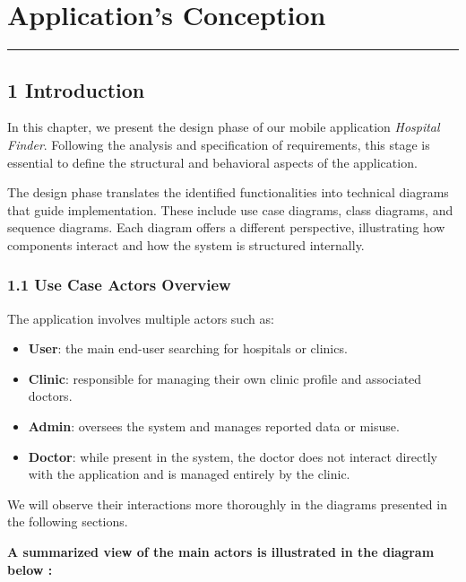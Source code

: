 \documentclass[12pt]{report}
\begin{document}
\newpage

\chapter{\textbf{Application's Conception}}
\rule{\linewidth}{1.5pt}


\section*{\textbf{1 Introduction}}

\noindent In this chapter, we present the design phase of our mobile application \textit{Hospital Finder}. Following the analysis and specification of requirements, this stage is essential to define the structural and behavioral aspects of the application.

\noindent The design phase translates the identified functionalities into technical diagrams that guide implementation. These include use case diagrams, class diagrams, and sequence diagrams. Each diagram offers a different perspective, illustrating how components interact and how the system is structured internally.

\subsection*{1.1 Use Case Actors Overview}

\noindent The application involves multiple actors such as:

\begin{itemize}
	\item \textbf{User}: the main end-user searching for hospitals or clinics.
	\item \textbf{Clinic}: responsible for managing their own clinic profile and associated doctors.
	\item \textbf{Admin}: oversees the system and manages reported data or misuse.
	\item \textbf{Doctor}: while present in the system, the doctor does not interact directly with the application and is managed entirely by the clinic.
\end{itemize}
\newpage
\noindent We will observe their interactions more thoroughly in the diagrams presented in the following sections.

\noindent \textbf{A summarized view of the main actors is illustrated in the diagram below :}
\end{document}
